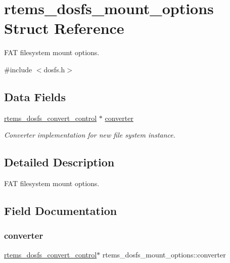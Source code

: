\hypertarget{structrtems__dosfs__mount__options}{}\section{rtems\+\_\+dosfs\+\_\+mount\+\_\+options Struct Reference}
\label{structrtems__dosfs__mount__options}


F\+AT filesystem mount options.  




{\ttfamily \#include $<$dosfs.\+h$>$}

\subsection*{Data Fields}
\begin{DoxyCompactItemize}
\item 
\mbox{\hyperlink{structrtems__dosfs__convert__control}{rtems\+\_\+dosfs\+\_\+convert\+\_\+control}} $\ast$ \mbox{\hyperlink{structrtems__dosfs__mount__options_af0fbb8805427b51c70d8637703af62d1}{converter}}
\begin{DoxyCompactList}\small\item\em Converter implementation for new file system instance. \end{DoxyCompactList}\end{DoxyCompactItemize}


\subsection{Detailed Description}
F\+AT filesystem mount options. 

\subsection{Field Documentation}
\mbox{\label{structrtems__dosfs__mount__options_af0fbb8805427b51c70d8637703af62d1}} 
\subsubsection{\texorpdfstring{converter}{converter}}
{\footnotesize\ttfamily \mbox{\hyperlink{structrtems__dosfs__convert__control}{rtems\+\_\+dosfs\+\_\+convert\+\_\+control}}$\ast$ rtems\+\_\+dosfs\+\_\+mount\+\_\+options\+::converter}



